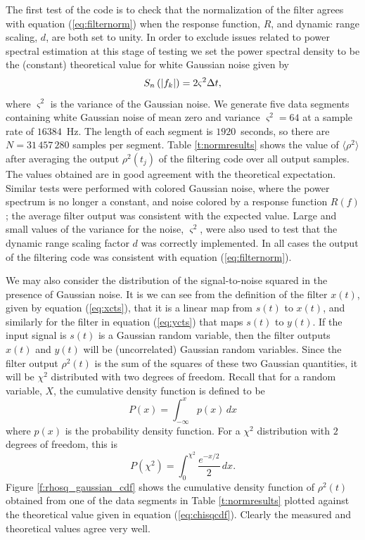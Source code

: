 The first test of the code is to check that the normalization
of the filter agrees with equation (\ref{eq:filternorm}) when the response
function, $R$, and dynamic range scaling, $d$, are both set to unity. In order
to exclude issues related to power spectral estimation at this stage of
testing  we set the power spectral density to be the (constant) theoretical
value for white Gaussian noise given by
\begin{equation}
S_n\left(\left|f_{k}\right|\right) = 2 \varsigma^2 \Delta t,
\label{eq:gaussianpsd}
\end{equation}
where $\varsigma^2$ is the variance of the Gaussian noise.  We generate five
data segments containing white Gaussian noise of mean zero and variance
$\varsigma^2 = 64$ at a sample rate of $16384$~Hz. The length of each segment
is $1920$~seconds, so there are $N = 31\,457\,280$ samples per segment. Table
\ref{t:normresults} shows the value of $\langle \rho^2 \rangle$ after
averaging the output $\rho^2(t_j)$ of the filtering code over all output
samples. The values obtained are in good agreement with the theoretical
expectation.  Similar tests were performed with colored Gaussian noise, where
the power spectrum is no longer a constant, and noise colored by a response
function $R(f)$; the average filter output was
consistent with the expected value.  Large and small values of the variance
for the noise, $\varsigma^2$, were also used to test that the dynamic
range scaling factor $d$ was correctly implemented. In all cases the output of
the filtering code was consistent with equation (\ref{eq:filternorm}).

We may also consider the distribution of the signal-to-noise squared in
the presence of Gaussian noise. It is we can see from the definition of the
filter $x(t)$, given by equation (\ref{eq:xcts}), that it is a linear map from
$s(t)$ to $x(t)$, and similarly for the filter in equation (\ref{eq:ycts}) that
maps $s(t)$ to $y(t)$. If the input signal is $s(t)$ is a Gaussian random
variable, then the filter outputs $x(t)$ and $y(t)$ will be (uncorrelated)
Gaussian random variables. Since the filter output $\rho^2(t)$ is the sum of
the squares of these two Gaussian quantities, it will be $\chi^2$ distributed
with two degrees of freedom. Recall that for a random variable, $X$, the
cumulative density function is defined to be
\begin{equation}
P(x) = \int_{-\infty}^x p(x)\, dx
\end{equation}
where $p(x)$ is the probability density function. For a $\chi^2$ distribution
with $2$ degrees of freedom, this is
\begin{equation}
P(\chi^2) = \int_0^{\chi^2} \frac{e^{-{x}/2}}{2}\,dx.
\label{eq:chisqcdf}
\end{equation}
Figure \ref{f:rhosq_gaussian_cdf} shows the cumulative density function of
$\rho^2(t)$ obtained from one of the data segments in Table
\ref{t:normresults} plotted against the theoretical value given in equation
(\ref{eq:chisqcdf}). Clearly the measured and theoretical values agree very
well.

